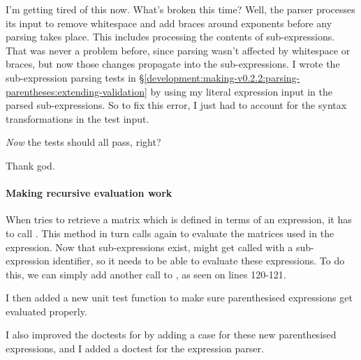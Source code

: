 \documentclass[../development.tex]{subfiles}
\begin{document}
I'm getting tired of this now. What's broken this time? Well, the parser processes its input to remove whitespace and add braces around exponents before any parsing takes place. This includes processing the contents of sub-expressions. That was never a problem before, since parsing wasn't affected by whitespace or braces, but now those changes propagate into the sub-expressions. I wrote the sub-expression parsing tests in \S\ref{development:making-v0.2.2:parsing-parentheses:extending-validation} by using my literal expression input in the parsed sub-expressions. So to fix this error, I just had to account for the syntax transformations in the test input.

\textit{Now} the tests should all pass, right?


Thank god.

\paragraph{Making recursive evaluation work\label{development:making-v0.2.2:parsing-parentheses:making-recursive-evaluation-work}}

When  tries to retrieve a matrix which is defined in terms of an expression, it has to call . This method in turn calls  again to evaluate the matrices used in the expression. Now that sub-expressions exist,  might get called with a sub-expression identifier, so it needs to be able to evaluate these expressions. To do this, we can simply add another call to , as seen on lines 120-121.


I then added a new unit test function to make sure parenthesised expressions get evaluated properly.



I also improved the doctests for  by adding a case for these new parenthesised expressions, and I added a doctest for the expression parser.
\end{document}

